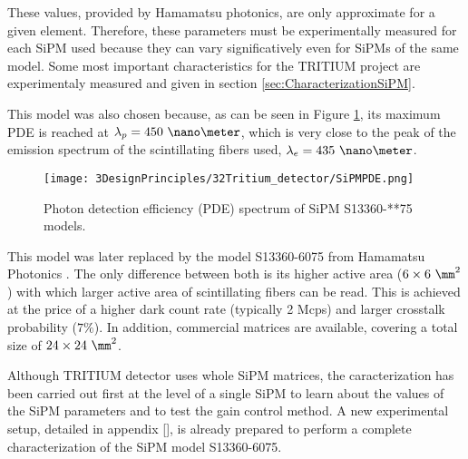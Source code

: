 These values, provided by Hamamatsu photonics, are only approximate for a given element. Therefore, these parameters must be experimentally measured for each SiPM used because they can vary significatively even for SiPMs of the same model. Some most important characteristics for the TRITIUM project are experimentaly measured and given in section \ref{sec:CharacterizationSiPM}. 

This model was also chosen because, as can be seen in Figure \ref{fig:PDESiPM}, its maximum PDE is reached at $\lambda_p=450~\nano\meter$, which is very close to the peak of the emission spectrum of the scintillating fibers used, $\lambda_e=435~\nano\meter$.

\begin{figure}[htbp]
\centering
\texttt{[image: 3DesignPrinciples/32Tritium\_detector/SiPMPDE.png]}
\caption{Photon detection efficiency (PDE) spectrum of SiPM S13360-**75 models.\label{fig:PDESiPM}}
\end{figure}

This model was later replaced by the model S13360-6075 from Hamamatsu Photonics \cite{DataSheetHammamatsu_1_SiPM_75}. The only difference between both is its higher active area ($6\times6~\mm^2$) with which larger active area of scintillating fibers can be read. This is achieved at the price of a higher dark count rate (typically 2 Mcps) and larger crosstalk probability ($7\%$). In addition, commercial matrices are available, covering a total size of $24\times24~\mm^2$.

Although TRITIUM detector uses whole SiPM matrices, the caracterization has been carried out first at the level of a single SiPM to learn about the values of the SiPM parameters and to test the gain control method. A new experimental setup, detailed in appendix \ref{}, is already  prepared to perform a complete characterization of the SiPM model S13360-6075.
